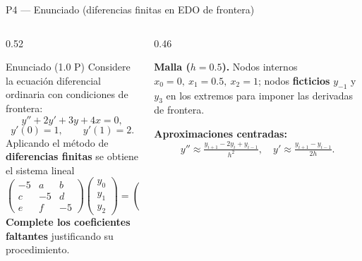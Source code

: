 \documentclass[aspectratio=169,10pt]{beamer}
\begin{document}
\begin{frame}{P4 — Enunciado (diferencias finitas en EDO de frontera)}
\begin{columns}[T]
\begin{column}{0.52\textwidth}
\begin{cardidea}{Enunciado \textmd{\small(1.0 P)}}{\faQuestionCircle}
{\footnotesize Considere la ecuación diferencial ordinaria con condiciones de frontera:
\[
y''+2y'+3y+4x=0,
\]
\[
y'(0)=1,\qquad y'(1)=2.
\]
Aplicando el método de \textbf{diferencias finitas} se obtiene el sistema lineal
\[
\begin{pmatrix}-5&a&b\\ c&-5&d\\ e&f&-5\end{pmatrix}\!\!\begin{pmatrix}y_0\\y_1\\y_2\end{pmatrix}=\begin{pmatrix}u\\v\\w\end{pmatrix}.
\]
\textbf{Complete los coeficientes faltantes} justificando su procedimiento.}
\end{cardidea}
\end{column}
\begin{column}{0.46\textwidth}
\begin{cardnota}[\faInfoCircle]
{\footnotesize \textbf{Malla ($h=0.5$).} Nodos internos $x_0{=}0,\ x_1{=}0.5,\ x_2{=}1$; nodos \textbf{ficticios} $y_{-1}$ y $y_3$ en los extremos para imponer las derivadas de frontera.}
\end{cardnota}
\vspace{1mm}
\begin{cardnota}[\faRuler]
{\footnotesize \textbf{Aproximaciones centradas:}
\[
y''\!\approx\!\tfrac{y_{i+1}-2y_i+y_{i-1}}{h^2},\quad
y'\!\approx\!\tfrac{y_{i+1}-y_{i-1}}{2h}.
\]}
\end{cardnota}
\end{column}
\end{columns}
\end{frame}
\end{document}
